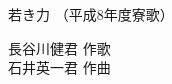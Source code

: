 \documentclass[10pt,b5j]{tarticle} %
\begin{document}
\begin{minipage}[c]{0.7\hsize} %
    \begin{center}
        {\LARGE
            若き力 %
        }
        {\small 
            （平成8年度寮歌） %
        }
    \end{center}
\end{minipage}
\begin{minipage}[c]{0.3\hsize} %
    \begin{flushright} %
        長谷川健君 作歌\\石井英一君 作曲 %
    \end{flushright}
\end{minipage}
\end{document}
